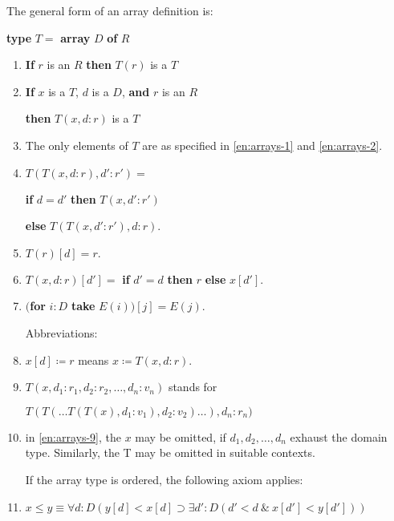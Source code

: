 The general form of an array definition is:

\quad \textbf{type} $T =$ \textbf{array} $D$ \textbf{of} $R$

\begin{enumerate}[wide, nosep, label=(\arabic*)]
	\item \label{en:arrays-1}
	\textbf{If} $r$ is an $R$ \textbf{then} $T(r)$ is a $T$

	\item \label{en:arrays-2}
	\textbf{If} $x$ is a $T$, $d$ is a $D$, \textbf{and} $r$ is an $R$

	\qquad\quad \textbf{then} $T(x, d:r)$ is a $T$

	\item The only elements of $T$ are as specified in \ref{en:arrays-1} and \ref{en:arrays-2}.

	\item $T(T(x, d:r), d':r') =$

	\quad \textbf{if} $d = d'$ \textbf{then} $T(x, d':r')$

	\qquad\quad\textbf{else} $T(T(x, d':r'), d:r).$

	\item $T(r)[d] = r.$

	\item $T(x, d:r)[d'] =$ \textbf{if} $d' = d$ \textbf{then} $r$ \textbf{else} $x[d'].$

	\item $($\textbf{for} $i:D$ \textbf{take} $E(i))[j] = E(j).$

	\noindent
	Abbreviations:

	\item $x[d] \coloneq r$ means $x \coloneq T(x, d:r)$.

	\item\label{en:arrays-9}
	 $T(x, d_1:r_1, d_2 : r_2, \dots, d_n:v_n)$ stands for

	\quad $T(T(\dots T(T(x), d_1:v_1), d_2:v_2)\dots), d_n:r_n)$

	\item in \ref{en:arrays-9}, the $x$ may be omitted, if $d_1, d_2, \dots, d_n$ exhaust the domain type. Similarly, the T may be omitted in suitable contexts.

If the array type is ordered, the following axiom applies:

	\item $x \leqslant y \equiv \forall d: D(y[d] < x[d] \supset \exists d':D(d' < d\ \&\ x[d'] < y[d']))$
\end{enumerate}

